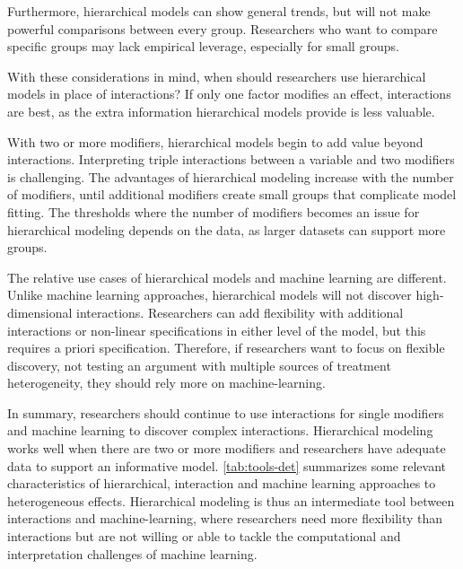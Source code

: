 \documentclass[12pt]{article}
\begin{document}
Furthermore, hierarchical models can show general trends, but will not make powerful comparisons between every group. 
Researchers who want to compare specific groups may lack empirical leverage, especially for small groups.


With these considerations in mind, when should researchers use hierarchical models in place of interactions?
If only one factor modifies an effect, interactions are best, as the extra information hierarchical models provide is less valuable. 


With two or more modifiers, hierarchical models begin to add value beyond interactions. 
Interpreting triple interactions between a variable and two modifiers is challenging. 
The advantages of hierarchical modeling increase with the number of modifiers, until additional modifiers create small groups that complicate model fitting. 
The thresholds where the number of modifiers becomes an issue for hierarchical modeling depends on the data, as larger datasets can support more groups. 


The relative use cases of hierarchical models and machine learning are different. 
Unlike machine learning approaches, hierarchical models will not discover high-dimensional interactions. 
Researchers can add flexibility with additional interactions or non-linear specifications in either level of the model, but this requires a priori specification. 
Therefore, if researchers want to focus on flexible discovery, not testing an argument with multiple sources of treatment heterogeneity, they should rely more on machine-learning. 


In summary, researchers should continue to use interactions for single modifiers and machine learning to discover complex interactions. 
Hierarchical modeling works well when there are two or more modifiers and researchers have adequate data to support an informative model.  
\autoref{tab:tools-det} summarizes some relevant characteristics of hierarchical, interaction and machine learning approaches to heterogeneous effects. 
Hierarchical modeling is thus an intermediate tool between interactions and machine-learning, where researchers need more flexibility than interactions but are not willing or able to tackle the computational and interpretation challenges of machine learning. 
\end{document}
